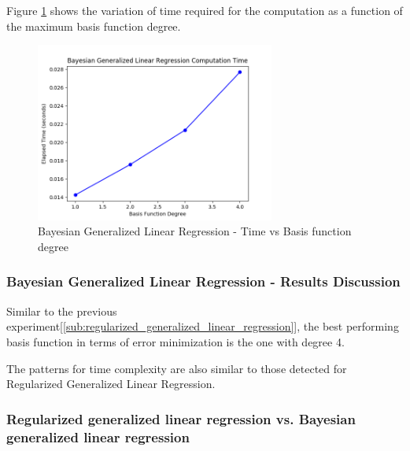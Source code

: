 \documentclass[parskip=full]{scrartcl}
\begin{document}
        Figure \ref{fig:bglg_time_v_deg} shows the variation of time required for the computation as a function of the maximum basis function degree.

        \begin{figure}
            \centering
            \includegraphics[width=0.7\textwidth]{3b_degree_vs_time.png}
            \caption{Bayesian Generalized Linear Regression - Time vs Basis function degree}
            \label{fig:bglg_time_v_deg}
        \end{figure}

        \subsubsection*{Bayesian Generalized Linear Regression - Results Discussion} %
        \label{ssub:bayesian_generalized_linear_regression_results_discussion}

            Similar to the previous experiment[\ref{sub:regularized_generalized_linear_regression}], the best performing basis function in terms of error minimization is the one with degree 4.

            The patterns for time complexity are also similar to those detected for Regularized Generalized Linear Regression. 
        

        \subsubsection*{Regularized generalized linear regression vs. Bayesian generalized linear regression} %
        \label{ssub:regularized_generalized_linear_regression_vs_bayesian_generalized_linear_regression}
\end{document}
